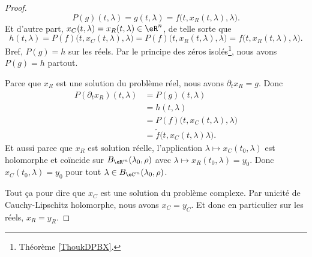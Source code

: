 \begin{proof}
	\begin{equation}
		P(g)(t,\lambda)  =g(t,\lambda)=f\big( t,x_R(t,\lambda),\lambda \big).
	\end{equation}
	Et d'autre part, \( x_C(t,\lambda)=x_R(t,\lambda)\in \eR^n\), de telle sorte que
	\begin{equation}
		h(t,\lambda)=P(f)\big( t,x_C(t,\lambda),\lambda \big)=P(f)\big( t,x_R(t,\lambda),\lambda \big)=f\big( t,x_R(t,\lambda),\lambda \big).
	\end{equation}
	Bref, \( P(g)=h\) sur les réels. Par le principe des zéros isolés\footnote{Théorème \ref{ThoukDPBX}.}, nous avons \( P(g)=h\) partout.

	Parce que \( x_R\) est une solution du problème réel, nous avons \( \partial_tx_R=g\). Donc
	\begin{subequations}
		\begin{align}
			P(\partial_tx_R)(t,\lambda) & =P(g)(t,\lambda)                              \\
			                            & =h(t,\lambda)                                 \\
			                            & =P(f)\big( t,x_C(t,\lambda),\lambda \big)     \\
			                            & =\tilde f\big( t,x_C(t,\lambda)\lambda \big).
		\end{align}
	\end{subequations}
	Et aussi parce que \( x_R\) est solution réelle, l'application \( \lambda\mapsto x_C(t_0,\lambda)\) est holomorphe et coïncide sur \( B_{\eR^m}(\lambda_0,\rho)\) avec \( \lambda\mapsto x_R(t_0,\lambda)=y_0 \). Donc \( x_C(t_0,\lambda)=y_0\) pour tout \( \lambda\in B_{\eC^m}(\lambda_0,\rho)\).

	Tout ça pour dire que \( x_C\) est une solution du problème complexe. Par unicité de Cauchy-Lipschitz holomorphe, nous avons \( x_C=y_C\). Et donc en particulier sur les réels, \( x_R=y_R\).
\end{proof}
